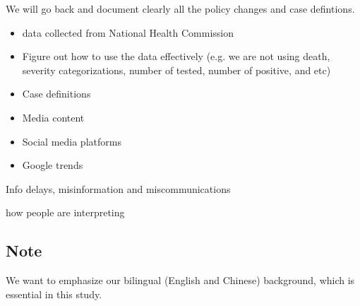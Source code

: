 
We will go back and document clearly all the policy changes and case defintions. 

\begin{itemize}
\item{data collected from National Health Commission}
\item{Figure out how to use the data effectively (e.g. we are not using death, severity categorizations, number of tested, number of positive, and etc)}
\item{Case definitions}
\item{Media content}
\item{Social media platforms}
\item{Google trends}
\end{itemize}


Info delays, misinformation and miscommunications


how people are interpreting 


\subsection{Note}
We want to emphasize our bilingual (English and Chinese) background, which is essential in this study.



